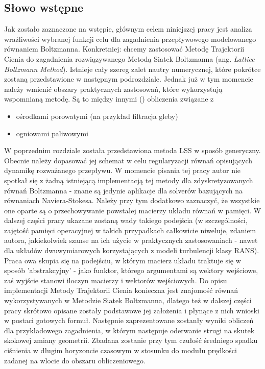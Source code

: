 \documentclass[12pt, twoside]{book}
\begin{document}
\subsection{Słowo wstępne}
Jak zostało zaznaczone na wstępie, głównym celem niniejszej pracy jest analiza wrażliwości wybranej funkcji celu dla zagadnienia przepływowego modelowanego równaniem Boltzmanna. Konkretniej: chcemy zastosować Metodę Trajektorii Cienia do zagadnienia rozwiązywanego Metodą Siatek Boltzmanna (ang. \textit{Lattice Boltzmann Method}). Istnieje cały szereg zalet nautry numerycznej, które pokrótce zostaną przedstawione w następnym podrozdziale. Jednak już w tym momencie należy wmienić obszary praktycznych zastosowań, które wykorzystują wspomnianą metodę. Są to między innymi (\cite{Espinoza}) obliczenia związane z
\begin{itemize}
	\item ośrodkami porowatymi (na przykład filtracja gleby)
	\item ogniowami paliwowymi
\end{itemize}
W poprzednim rozdziale została przedstawiona metoda LSS w sposób generyczny. Obecnie należy dopasować jej schemat w celu regularyzacji równań opisujących dynamikę rozważanego przepływu. W momencie pisania tej pracy autor nie spotkał się z żadną istniejącą implementacją tej metody dla zdyskretyzowanych równań Boltzmanna - znane są jedynie aplikacje dla solverów bazujących na równaniach Naviera-Stokesa. Należy przy tym dodatkowo zaznaczyć, że wszystkie one oparte są o przechowywanie powstałej macierzy układu równań w pamięci. W dalszej części pracy ukazane zostaną wady takiego podejścia (w szczególności, zajętość pamięci operacyjnej w takich przypadkach całkowicie niweluje, zdaniem autora, jakiekolwiek szanse na ich użycie w praktycznych zastosowaniach - nawet dla układów dwuwymiarowych korzystających z modeli turbulencji klasy RANS). Praca owa skupia się na podejściu, w którym macierz układu traktuje się w sposób 'abstrakcyjny' - jako funktor, którego argumentami są wektory wejściowe, zaś wyjście stanowi iloczyn macierzy i wektorów wejściowych.
Do opisu implementacji Metody Trajektorii Cienia konieczna jest znajomość równań wykorzystywanych w Metodzie Siatek Boltzmanna, dlatego też w dalszej części pracy skrótowo opisane zostały podstawowe jej założenia i płynące z nich wnioski w postaci gotowych formuł. Następnie zaprezentowane zostanły wyniki obliczeń dla przykładowego zagadnienia, w którym następuje oderwanie strugi na skutek skokowej zmiany geometrii. Zbadana zostanie przy tym czułość średniego spadku ciśnienia w długim horyzoncie czasowym w stosunku do modułu prędkości zadanej na wlocie do obszaru obliczeniowego.
\end{document}
